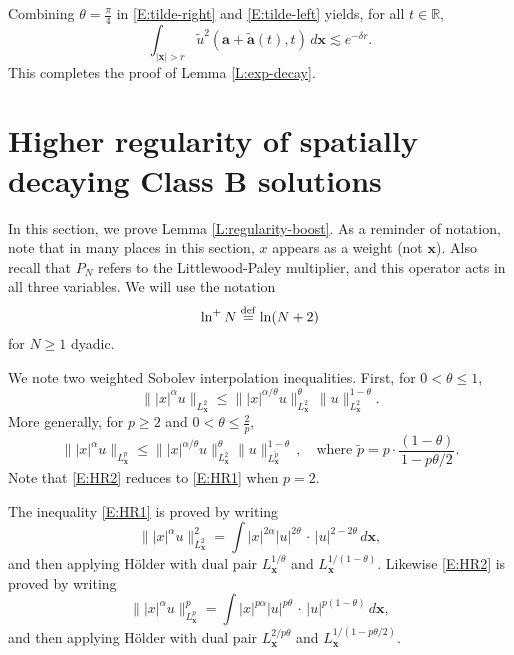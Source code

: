 \documentclass[12pt,letterpaper]{amsart}
\newcommand{\defeq}{\stackrel{\rm{def}}{=}}
\theoremstyle{remark}
\numberwithin{equation}{section}
\numberwithin{theorem}{section}
\numberwithin{table}{section}
\begin{document}
Combining $\theta=\frac{\pi}{4}$ in \eqref{E:tilde-right} and \eqref{E:tilde-left} yields, for all $t\in \mathbb{R}$,
\begin{equation}
\label{E:tilde-u-decay-1}
\int_{|\mathbf{x}| > r} \tilde u^2(\mathbf{a}+\tilde{\mathbf{a}}(t),t) \,d \mathbf{x} \lesssim e^{-\delta r}.
\end{equation}
This completes the proof of Lemma \ref{L:exp-decay}.

\section{Higher regularity of spatially decaying Class B solutions}
\label{S:higher-regularity}


In this section, we prove Lemma \ref{L:regularity-boost}. As a reminder of notation, note that in many places in this section, $x$ appears as a weight (not $\mathbf{x}$).  Also recall that $P_N$ refers to the Littlewood-Paley multiplier, and this operator acts in all three variables.  We will use the notation
$$\ln^+N \defeq \ln(N+2)$$
for $N\geq 1$ dyadic.

We note two weighted Sobolev interpolation inequalities.  First, for $0<\theta\leq 1$,
\begin{equation}
\label{E:HR1}
\| |x|^\alpha u \|_{L_{\mathbf{x}}^2} \leq \| |x|^{\alpha/\theta} u \|_{L_{\mathbf{x}}^2}^\theta \, \|u\|_{L_{\mathbf{x}}^2}^{1-\theta}.
\end{equation}
More generally, for $p\geq 2$ and $0< \theta \leq \frac{2}{p}$,
\begin{equation}
\label{E:HR2}
\| |x|^\alpha u \|_{L_{\mathbf{x}}^p} \leq \| |x|^{\alpha/\theta} u \|_{L_{\mathbf{x}}^2}^\theta \|u \|_{L_{\mathbf{x}}^{\tilde p}}^{1-\theta}\,, \quad \text{where } \tilde p = p \cdot \frac{(1-\theta)}{1-p \theta/2}.
\end{equation}
Note that \eqref{E:HR2} reduces to \eqref{E:HR1} when $p=2$.

The inequality \eqref{E:HR1} is proved by writing
$$ 
\| |x|^\alpha u \|_{L_{\mathbf{x}}^2}^2 = \int |x|^{2\alpha} |u|^{2\theta} \, \cdot \, |u|^{2-2\theta} \, d\mathbf{x},
$$
and then applying H\"older with dual pair $L_{\mathbf{x}}^{1/\theta}$ and $L_{\mathbf{x}}^{1/(1-\theta)}$.   Likewise \eqref{E:HR2} is proved by writing
$$ 
\| |x|^\alpha u \|_{L_{\mathbf{x}}^p}^p = \int |x|^{p\alpha} |u|^{p\theta} \, \cdot \, |u|^{p(1-\theta)} \, d\mathbf{x},
$$
and then applying H\"older with dual pair $L_{\mathbf{x}}^{2/p\theta}$ and $L_{\mathbf{x}}^{1/(1-p\theta/2)}$.
\end{document}
